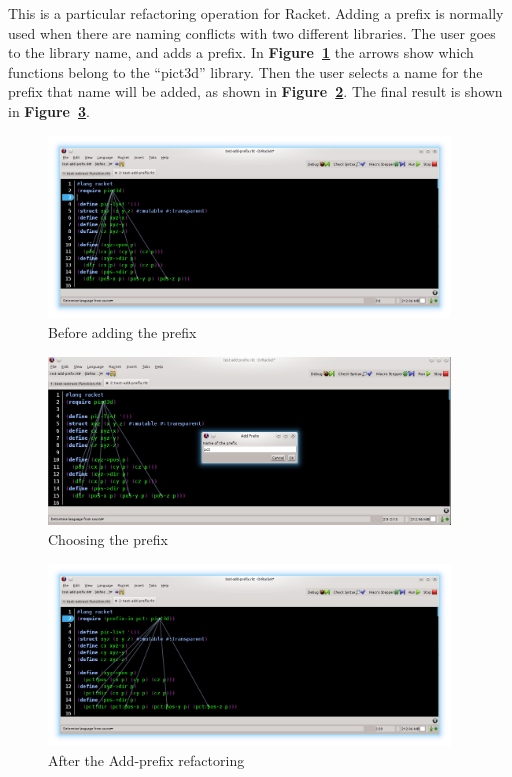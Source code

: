 This is a particular refactoring operation for Racket. Adding a prefix is normally used when there are naming conflicts with two different libraries. The user goes to the library name, and adds a prefix.
In {\bf Figure~\ref{fig:addPrefixBefore}} the arrows show which functions belong to the ``pict3d'' library.
Then the user selects a name for the prefix that name will be added, as shown in {\bf Figure~\ref{fig:addPrefixDuring}}. The final result is shown in {\bf Figure~\ref{fig:addPrefixAfter}}.

\begin{figure}[htbp]
	\centering
	\includegraphics[width=0.95\textwidth]{img/add-prefix.png}
	\caption{Before adding the prefix}
	\label{fig:addPrefixBefore}
\end{figure}

\begin{figure}[htbp]
	\centering
	\includegraphics[width=0.95\textwidth]{img/add-prefix1.png}
	\caption{Choosing the prefix}
	\label{fig:addPrefixDuring}
\end{figure}

\begin{figure}[htbp]
	\centering
	\includegraphics[width=0.95\textwidth]{img/add-prefix2.png}
	\caption{After the Add-prefix refactoring}
	\label{fig:addPrefixAfter}
\end{figure}